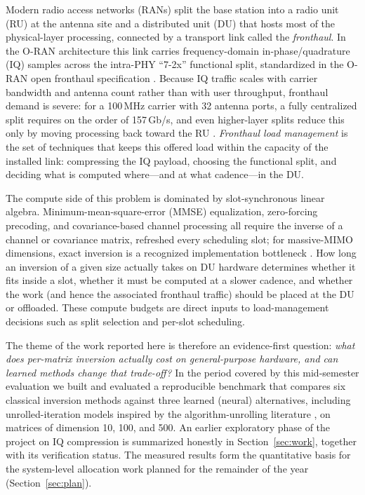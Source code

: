 \documentclass[11pt,a4paper]{article}
\begin{document}
Modern radio access networks (RANs) split the base station into a radio unit
(RU) at the antenna site and a distributed unit (DU) that hosts most of the
physical-layer processing, connected by a transport link called the
\emph{fronthaul}. In the O-RAN architecture this link carries frequency-domain
in-phase/quadrature (IQ) samples across the intra-PHY ``7-2x'' functional
split, standardized in the O-RAN open fronthaul specification
\cite{oran_cus}\cite{polese2023oran}. Because IQ traffic scales with carrier
bandwidth and antenna count rather than with user throughput, fronthaul demand
is severe: for a 100\,MHz carrier with 32 antenna ports, a fully centralized
split requires on the order of 157\,Gb/s, and even higher-layer splits reduce
this only by moving processing back toward the RU \cite{larsen2019survey}.
\emph{Fronthaul load management} is the set of techniques that keeps this
offered load within the capacity of the installed link: compressing the IQ
payload, choosing the functional split, and deciding what is computed
where---and at what cadence---in the DU.

The compute side of this problem is dominated by slot-synchronous linear
algebra. Minimum-mean-square-error (MMSE) equalization, zero-forcing
precoding, and covariance-based channel processing all require the inverse of
a channel or covariance matrix, refreshed every scheduling slot; for
massive-MIMO dimensions, exact inversion is a recognized implementation
bottleneck \cite{wu2014mimo}. How long an inversion of a given size actually
takes on DU hardware determines whether it fits inside a slot, whether it must
be computed at a slower cadence, and whether the work (and hence the
associated fronthaul traffic) should be placed at the DU or offloaded. These
compute budgets are direct inputs to load-management decisions such as
split selection and per-slot scheduling.

The theme of the work reported here is therefore an evidence-first question:
\emph{what does per-matrix inversion actually cost on general-purpose
hardware, and can learned methods change that trade-off?} In the period
covered by this mid-semester evaluation we built and evaluated a reproducible
benchmark that compares six classical inversion methods against three learned
(neural) alternatives, including unrolled-iteration models inspired by the
algorithm-unrolling literature \cite{gregor2010lista}\cite{monga2021unrolling},
on matrices of dimension 10, 100, and 500. An earlier exploratory phase of the
project on IQ compression is summarized honestly in
Section~\ref{sec:work}, together with its verification status. The
measured results form the quantitative basis for the system-level allocation
work planned for the remainder of the year (Section~\ref{sec:plan}).
\end{document}
